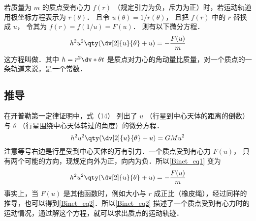 

若质量为 $m$ 的质点受有心力 $f(r)$ （规定引力为负，斥力为正）时，若运动轨道用极坐标方程表示为 $r(\theta)$． 且令 $u(\theta) = 1/r(\theta)$， 且把 $f(r)$ 中的 $r$ 替换成 $u$， 令其为 $f(r) = f(1/u) = F(u)$． 则有以下微分方程．
\begin{equation}
h^2 u^2 \qty( \dv[2]{u}{\theta} + u ) = -\frac{F(u)}{m}
\end{equation} 
这方程叫做．其中 $h = r^2 \dv*{\theta}{t}$ 是质点对力心的角动量比质量，对一个质点的一条轨道来说，是一个常数．

\subsection{推导}
在开普勒第一定律证明中，式（14）%
列出了 $u$ （行星到中心天体的距离的倒数）与 $\theta $ （行星围绕中心天体转过的角度）的微分方程． 
\begin{equation}\label{Binet_eq1}
h^2 u^2 \qty( \dv[2]{u}{\theta} + u ) =  GMu^2
\end{equation} 
注意等号右边是行星受到中心天体的万有引力．一个质点受到有心力%
 $F(u)$， 只有两个可能的方向，现规定向外为正，向内为负．所以\autoref{Binet_eq1} 变为
\begin{equation}\label{Binet_eq2}
h^2 u^2 \qty( \dv[2]{u}{\theta} + u ) = -\frac{F(u)}{m}
\end{equation} 
事实上，当 $F(u)$ 是其他函数时，例如大小与 $r$ 成正比（橡皮绳），经过同样的推导，也可以得到\autoref{Binet_eq2}．所以\autoref{Binet_eq2} 描述了一个质点受到有心力时的运动情况，通过解这个方程，就可以求出质点的运动轨迹．














